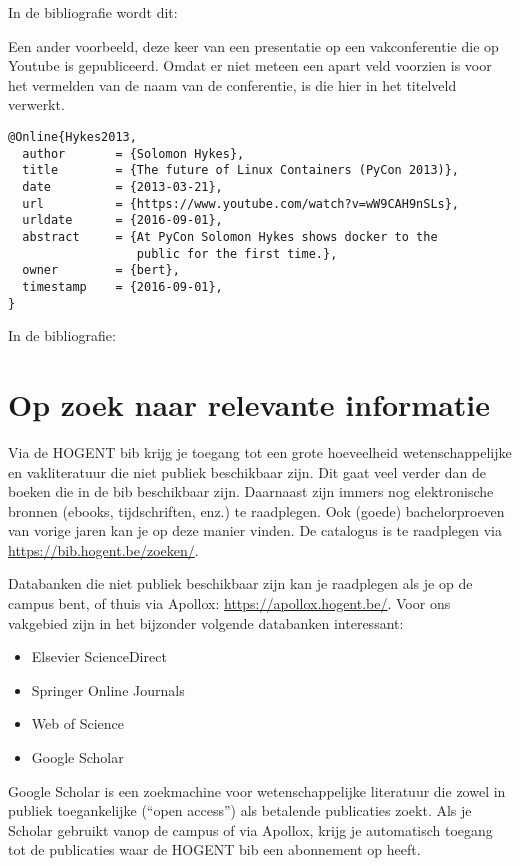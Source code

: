 In de bibliografie wordt dit: 

Een ander voorbeeld, deze keer van een presentatie op een vakconferentie die op Youtube is gepubliceerd. Omdat er niet meteen een apart veld voorzien is voor het vermelden van de naam van de conferentie, is die hier in het titelveld verwerkt.

\begin{verbatim}
@Online{Hykes2013,
  author       = {Solomon Hykes},
  title        = {The future of Linux Containers (PyCon 2013)},
  date         = {2013-03-21},
  url          = {https://www.youtube.com/watch?v=wW9CAH9nSLs},
  urldate      = {2016-09-01},
  abstract     = {At PyCon Solomon Hykes shows docker to the
                  public for the first time.},
  owner        = {bert},
  timestamp    = {2016-09-01},
}
\end{verbatim}

In de bibliografie: 

\section{Op zoek naar relevante informatie}
\label{sec:op_zoek_naar_relevante_informatie}

Via de HOGENT bib krijg je toegang tot een grote hoeveelheid wetenschappelijke en vakliteratuur die niet publiek beschikbaar zijn. Dit gaat veel verder dan de boeken die in de bib beschikbaar zijn. Daarnaast zijn immers nog elektronische bronnen (ebooks, tijdschriften, enz.) te raadplegen. Ook (goede) bachelorproeven van vorige jaren kan je op deze manier vinden. De catalogus is te raadplegen via \url{https://bib.hogent.be/zoeken/}.

Databanken die niet publiek beschikbaar zijn kan je raadplegen als je op de campus bent, of thuis via Apollox: \url{https://apollox.hogent.be/}. Voor ons vakgebied zijn in het bijzonder volgende databanken interessant:

\begin{itemize}
  \item Elsevier ScienceDirect
  \item Springer Online Journals
  \item Web of Science
  \item Google Scholar
\end{itemize}

Google Scholar is een zoekmachine voor wetenschappelijke literatuur die zowel in publiek toegankelijke (``open access'') als betalende publicaties zoekt. Als je Scholar gebruikt vanop de campus of via Apollox, krijg je automatisch toegang tot de publicaties waar de HOGENT bib een abonnement op heeft.

